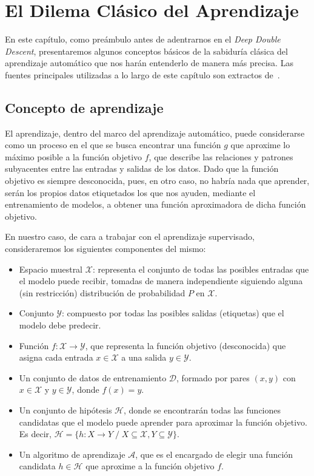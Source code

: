 \chapter{El Dilema Clásico del Aprendizaje}\label{ch:dilema-aprendizaje}

En este capítulo, como preámbulo antes de adentrarnos en el \textit{Deep Double Descent}, presentaremos algunos conceptos básicos de la sabiduría clásica del aprendizaje automático que nos harán entenderlo de manera más precisa. Las fuentes principales utilizadas a lo largo de este capítulo son extractos de~\cite{Mostafa2012, Bishop2006}.

\section{Concepto de aprendizaje}\label{sec:concepto-de-aprendizaje}
El aprendizaje, dentro del marco del aprendizaje automático, puede considerarse como un proceso en el que se busca encontrar una función $g$ que aproxime lo máximo posible a la función objetivo $f$, que describe las relaciones y patrones subyacentes entre las entradas y salidas de los datos. Dado que la función objetivo es siempre desconocida, pues, en otro caso, no habría nada que aprender, serán los propios datos etiquetados los que nos ayuden, mediante el entrenamiento de modelos, a obtener una función aproximadora de dicha función objetivo.

En nuestro caso, de cara a trabajar con el aprendizaje supervisado, consideraremos los siguientes componentes del mismo:
\begin{itemize}
    \item Espacio muestral $\mathcal{X}$: representa el conjunto de todas las posibles entradas que el modelo puede recibir, tomadas de manera independiente siguiendo alguna (sin restricción) distribución de probabilidad $P$ en $\mathcal{X}$.
    \item Conjunto $\mathcal{Y}$: compuesto por todas las posibles salidas (etiquetas) que el modelo debe predecir.
    \item Función $f: \mathcal{X} \rightarrow \mathcal{Y}$, que representa la función objetivo (desconocida) que asigna cada entrada $x \in \mathcal{X}$ a una salida $y \in \mathcal{Y}$.
    \item Un conjunto de datos de entrenamiento $\mathcal{D}$, formado por pares $(x, y)$ con $x \in \mathcal{X}$ y $y \in \mathcal{Y}$, donde $f(x) = y$.
    \item Un conjunto de hipótesis $\mathcal{H}$, donde se encontrarán todas las funciones candidatas que el modelo puede aprender para aproximar la función objetivo. Es decir, $\mathcal{H} = \{h: X \rightarrow Y \; / \; X \subseteq \mathcal{X}, Y \subseteq \mathcal{Y}\}$. 
    \item Un algoritmo de aprendizaje $\mathcal{A}$, que es el encargado de elegir una función candidata $h \in \mathcal{H}$ que aproxime a la función objetivo $f$.
\end{itemize}

